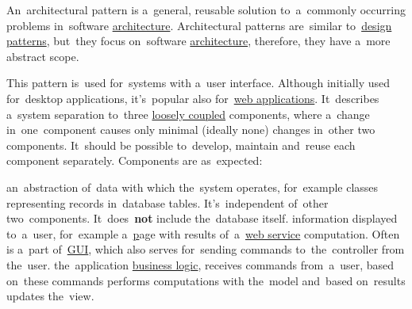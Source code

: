 \label{architecturalpatterns}
An~architectural pattern is a~general, reusable solution to~a~commonly occurring problems in~software \hyperref[architecturedesign]{architecture}.  Architectural patterns are~similar to~\hyperref[designpatterns]{design patterns}, but~they focus on~software \hyperref[architecturedesign]{architecture}, therefore, they have a~more abstract scope.

\label{mvc}
This pattern is~used for~systems with a~user interface.
Although initially used for~desktop applications, it's~popular also for~\hyperref[webserviceapplication]{web applications}.
It~describes a~system separation to~three \hyperref[loosetightcoupling]{loosely coupled} components, where a~change in~one~component causes only minimal (ideally none) changes in~other two components.
It~should be possible to~develop, maintain and~reuse each component separately.
Components are as~expected:
\begin{itemize}
     an~abstraction of~data with which the~system operates, for~example classes representing records in~database tables.
             It's~independent of~other two~components.
          \warningnonl It~does~\textbf{not} include the~database itself.
     information displayed to~a~user, for~example a~\hyperref[web] page with results of~a~\hyperref[webserviceapplication]{web service} computation.
             Often is a~part of~\hyperref[shellcligui]{GUI}, which also serves for~sending commands to~the~controller from the~user.
     the~application \hyperref[businesslogic]{business logic}, receives commands from~a~user, based on~these commands performs computations with the~model and~based on~results updates the~view.
\end{itemize}

